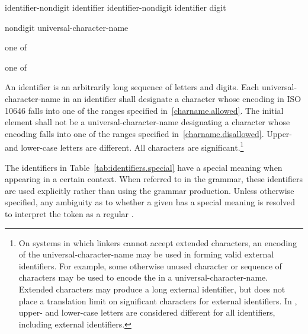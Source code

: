 %
\begin{bnf}
\br
    identifier-nondigit\br
    identifier identifier-nondigit\br
    identifier digit
\end{bnf}

\begin{bnf}
\br
    nondigit\br
    universal-character-name\br
\end{bnf}

\begin{bnf}
 \textnormal{one of}\br
    \br
    \br
    \br
\end{bnf}

\begin{bnf}
 \textnormal{one of}\br
\end{bnf}

\pnum
{}%
%
An identifier is an arbitrarily long sequence of letters and digits.
Each universal-character-name in an identifier shall designate a
character whose encoding in ISO 10646 falls into one of the ranges
specified in~\ref{charname.allowed}.
The initial element shall not be a universal-character-name
designating a character whose encoding falls into one of the ranges
specified in~\ref{charname.disallowed}.
Upper- and lower-case letters are
different. All characters are significant.\footnote{On systems in which linkers cannot accept extended
characters, an encoding of the universal-character-name may be used in
forming valid external identifiers. For example, some otherwise unused
character or sequence of characters may be used to encode the
 in a universal-character-name. Extended
characters may produce a long external identifier, but \Cpp does not
place a translation limit on significant characters for external
identifiers. In \Cpp, upper- and lower-case letters are considered
different for all identifiers, including external identifiers. }

\pnum
The identifiers in Table~\ref{tab:identifiers.special} have a special meaning when
appearing in a certain context. When referred to in the grammar, these identifiers
are used explicitly rather than using the  grammar production.
Unless otherwise specified, any ambiguity as to whether a given
 has a special meaning is resolved to interpret the
token as a regular .

